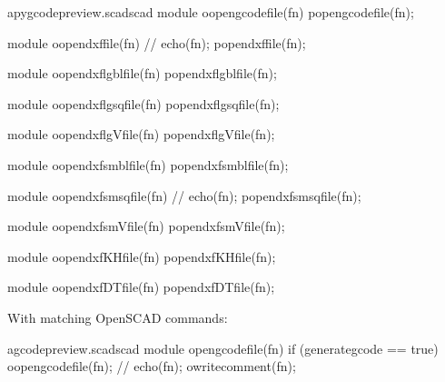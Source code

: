 \documentclass{ltxdoc}
\begin{document}
\lstset{firstnumber=\thepyscad}
\begin{writecode}{a}{pygcodepreview.scad}{scad}
module oopengcodefile(fn) {
    popengcodefile(fn);
}

module oopendxffile(fn) {
//    echo(fn);
    popendxffile(fn);
}

module oopendxflgblfile(fn) {
    popendxflgblfile(fn);
}

module oopendxflgsqfile(fn) {
    popendxflgsqfile(fn);
}

module oopendxflgVfile(fn) {
    popendxflgVfile(fn);
}

module oopendxfsmblfile(fn) {
    popendxfsmblfile(fn);
}

module oopendxfsmsqfile(fn) {
//    echo(fn);
    popendxfsmsqfile(fn);
}

module oopendxfsmVfile(fn) {
    popendxfsmVfile(fn);
}

module oopendxfKHfile(fn) {
    popendxfKHfile(fn);
}

module oopendxfDTfile(fn) {
    popendxfDTfile(fn);
}

\end{writecode}
\addtocounter{pyscad}{42}

With matching OpenSCAD commands: %
 
\lstset{firstnumber=\thegcpscad}
\begin{writecode}{a}{gcodepreview.scad}{scad}
module opengcodefile(fn) {
if (generategcode == true) {
    oopengcodefile(fn);
//    echo(fn);
    owritecomment(fn);
    }
}

\end{writecode}
\addtocounter{gcpscad}{8}
\end{document}
